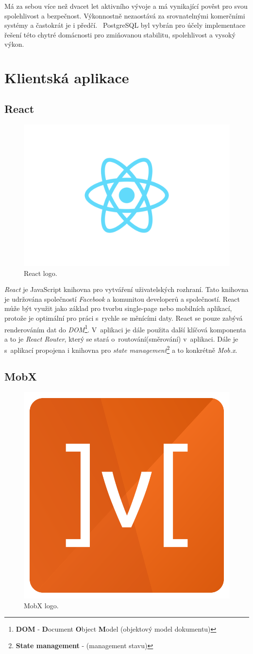Má za sebou více než dvacet let aktivního vývoje a má vynikající pověst pro svou spolehlivost a bezpečnost.
Výkonnostně nezaostává za srovnatelnými komerčními systémy a častokrát je i předčí.~\cite{postgres:wiki}
PostgreSQL byl vybrán pro účely implementace řešení této chytré domácnosti pro zmiňovanou stabilitu, spolehlivost a vysoký výkon.

\newpage
\section{Klientská aplikace}
\label{pouzite:frontend}

\subsection*{React}
\label{frontend:react}

\begin{figure}[hbt]
  \centering
  \includegraphics[width=.3 \linewidth]{obrazky-figures/react.png}
  \caption{React logo.~\cite{react:info}}
\end{figure}

\emph{React} je JavaScript knihovna pro vytváření uživatelských rozhraní.
Tato knihovna je udržována společností \emph{Facebook} a komunitou developerů a společností.
React může být využit jako základ pro tvorbu single-page nebo mobilních aplikací, protože je optimální pro práci s~rychle se měnícími daty.
React se pouze zabývá renderováním dat do \emph{DOM}\footnote{\textbf{DOM} - \textbf{D}ocument \textbf{O}bject \textbf{M}odel (objektový model dokumentu)}.
V~aplikaci je dále použita další klíčová komponenta a to je \emph{React Router}, který se stará o~routování(směrování) v~aplikaci.
Dále je s~aplikací propojena i knihovna pro \emph{state management}\footnote{\textbf{State management} - (management stavu)} a to konkrétně \emph{Mob.x}.~\cite{react:info}

\subsection*{MobX}
\label{frontend:mobx}
\begin{figure}[hbt]
  \centering
  \includegraphics[width=.1 \linewidth]{obrazky-figures/mobx.png}
  \caption{MobX logo.~\cite{mobx:info}}
\end{figure}


